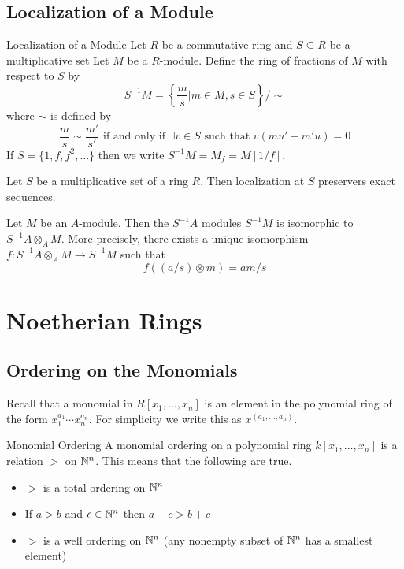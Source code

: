 \documentclass[a4paper]{article}
\begin{document}
\subsection{Localization of a Module}
\begin{defn}{Localization of a Module}{} Let $R$ be a commutative ring and $S\subseteq R$ be a multiplicative set Let $M$ be a $R$-module. Define the ring of fractions of $M$ with respect to $S$ by $$S^{-1}M=\left\{\frac{m}{s}|m\in M,s\in S\right\}/\sim$$ where $\sim$ is defined by $$\frac{m}{s}\sim\frac{m'}{s'}\text{ if and only if }\exists v\in S\text{ such that }v(mu'-m'u)=0$$
If $S=\{1,f,f^2,\dots\}$ then we write $S^{-1}M=M_f=M[1/f]$. 
\end{defn}

\begin{prp}{}{} Let $S$ be a multiplicative set of a ring $R$. Then localization at $S$ preservers exact sequences. 
\end{prp}

\begin{prp}{}{} Let $M$ be an $A$-module. Then the $S^{-1}A$ modules $S^{-1}M$ is isomorphic to $S^{-1}A\otimes_AM$. More precisely, there exists a unique isomorphism $f:S^{-1}A\otimes_AM\to S^{-1}M$ such that $$f((a/s)\otimes m)=am/s$$
\end{prp}

\pagebreak
\section{Noetherian Rings}
\subsection{Ordering on the Monomials}
Recall that a monomial in $R[x_1,\dots,x_n]$ is an element in the polynomial ring of the form $x_1^{a_1}\cdots x_n^{a_n}$. For simplicity we write this as $x^{(a_1,\dots,a_n)}$. 

\begin{defn}{Monomial Ordering}{} A monomial ordering on a polynomial ring $k[x_1,\dots,x_n]$ is a relation $>$ on $\mathbb{N}^n$. This means that the following are true. 
\begin{itemize}
\item $>$ is a total ordering on $\mathbb{N}^n$
\item If $a>b$ and $c\in\mathbb{N}^n$ then $a+c>b+c$
\item $>$ is a well ordering on $\mathbb{N}^n$ (any nonempty subset of $\mathbb{N}^n$ has a smallest element)
\end{itemize}
\end{defn}
\end{document}
